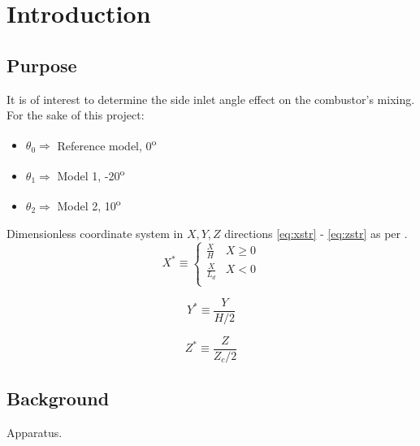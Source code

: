 \chapter{Introduction}
\label{ch:intro}

\section{Purpose}
\label{sect:purpose}
It is of interest to determine the side inlet angle effect on the combustor's mixing. For the sake of this project:

\begin{itemize}
\item $\theta_0 \Rightarrow$ Reference model, 0\textsuperscript{o} 
\item $\theta_1 \Rightarrow$ Model 1, -20\textsuperscript{o} 
\item $\theta_2 \Rightarrow$ Model 2, 10\textsuperscript{o}\\
\end{itemize}

Dimensionless coordinate system in $X,Y,Z$ directions \ref{eq:xstr} - \ref{eq:zstr} as per \cite{art}.
\begin{equation}
	X^* \equiv
	\begin{cases}
 		\frac{X}{H} & X\geq 0\\
		\frac{X}{L_d} & X < 0\\
	\end{cases}
	\label{eq:xstr}
\end{equation}

\begin{equation}
	\label{eq:ystr}
	Y^* \equiv \frac{Y}{H/2}
\end{equation}

\begin{equation}
	\label{eq:zstr}
	Z^* \equiv \frac{Z}{Z_c /2}
\end{equation}

\section{Background}
\label{sect:background}
Apparatus. \\

